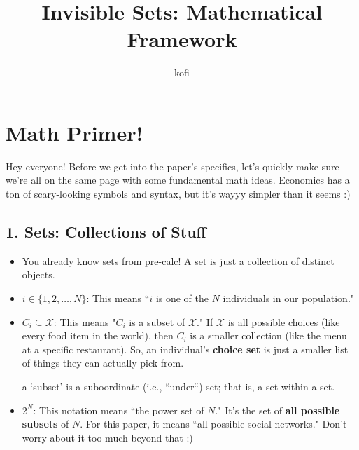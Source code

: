 \documentclass{article}
\title{Invisible Sets: Mathematical Framework}
\author{kofi}
\date{}
\newcommand{\X}{\mathcal{X}}
\begin{document}
\maketitle

\section{Math Primer!}
Hey everyone! Before we get into the paper's specifics, let's quickly make sure we're all on the same page with some fundamental math ideas. Economics has a ton of scary-looking symbols and syntax, but it's wayyy simpler than it seems :)

\subsection*{1. Sets: Collections of Stuff}
\begin{itemize}

    \item You already know sets from pre-calc! A set is just a collection of distinct objects.
    
    \item $i \in \{1, 2, \ldots, N\}$: This means ``$i$ is one of the $N$ individuals in our population."
    
    \item $C_i \subseteq \X$: This means "$C_i$ is a subset of $\X$." If $\X$ is all possible choices (like every food item in the world), then $C_i$ is a smaller collection (like the menu at a specific restaurant). So, an individual's \textbf{choice set} is just a smaller list of things they can actually pick from.
    
    \begin{tcolorbox}[mycommentbox,title=language]
    a `subset' is a suboordinate (i.e., ``under``) set; that is, a set within a set.
    \end{tcolorbox}
    
    \item $2^N$: This notation means ``the power set of $N$." It's the set of \textbf{all possible subsets} of $N$. For this paper, it means ``all possible social networks." Don't worry about it too much beyond that :)
    
\end{itemize}
\end{document}
